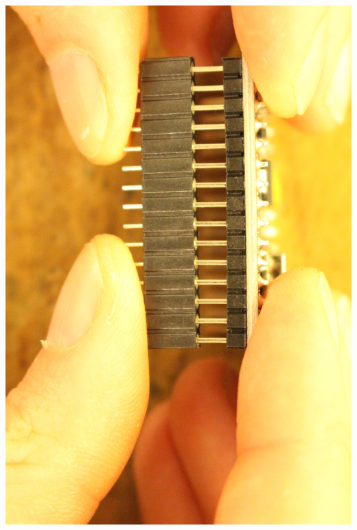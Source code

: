 \documentclass{article}
\begin{document}
\begin{minipage}[b]{0.5\textwidth}
	\includegraphics[width=\textwidth]{Bilder2019/IMG_6455.JPG}
\end{minipage}

\vspace{0.5cm}
\end{document}
